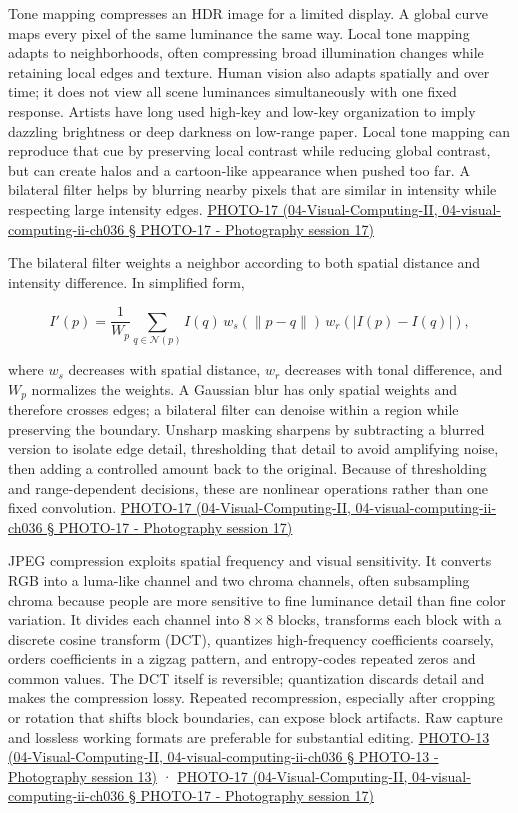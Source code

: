 Tone mapping compresses an HDR image for a limited display. A global curve maps every pixel of the same luminance the same way. Local tone mapping adapts to neighborhoods, often compressing broad illumination changes while retaining local edges and texture. Human vision also adapts spatially and over time; it does not view all scene luminances simultaneously with one fixed response. Artists have long used high-key and low-key organization to imply dazzling brightness or deep darkness on low-range paper. Local tone mapping can reproduce that cue by preserving local contrast while reducing global contrast, but can create halos and a cartoon-like appearance when pushed too far. A bilateral filter helps by blurring nearby pixels that are similar in intensity while respecting large intensity edges. \href{}{PHOTO-17 (04-Visual-Computing-II, 04-visual-computing-ii-ch036 § PHOTO-17 - Photography session 17)}

The bilateral filter weights a neighbor according to both spatial distance and intensity difference. In simplified form,

\[
I'(p)=\frac{1}{W_p}\sum_{q\in\mathcal N(p)} I(q)\,w_s(\|p-q\|)\,w_r(|I(p)-I(q)|),
\]

where \(w_s\) decreases with spatial distance, \(w_r\) decreases with tonal difference, and \(W_p\) normalizes the weights. A Gaussian blur has only spatial weights and therefore crosses edges; a bilateral filter can denoise within a region while preserving the boundary. Unsharp masking sharpens by subtracting a blurred version to isolate edge detail, thresholding that detail to avoid amplifying noise, then adding a controlled amount back to the original. Because of thresholding and range-dependent decisions, these are nonlinear operations rather than one fixed convolution. \href{}{PHOTO-17 (04-Visual-Computing-II, 04-visual-computing-ii-ch036 § PHOTO-17 - Photography session 17)}

JPEG compression exploits spatial frequency and visual sensitivity. It converts RGB into a luma-like channel and two chroma channels, often subsampling chroma because people are more sensitive to fine luminance detail than fine color variation. It divides each channel into \(8\times8\) blocks, transforms each block with a discrete cosine transform (DCT), quantizes high-frequency coefficients coarsely, orders coefficients in a zigzag pattern, and entropy-codes repeated zeros and common values. The DCT itself is reversible; quantization discards detail and makes the compression lossy. Repeated recompression, especially after cropping or rotation that shifts block boundaries, can expose block artifacts. Raw capture and lossless working formats are preferable for substantial editing. \href{}{PHOTO-13 (04-Visual-Computing-II, 04-visual-computing-ii-ch036 § PHOTO-13 - Photography session 13)} · \href{}{PHOTO-17 (04-Visual-Computing-II, 04-visual-computing-ii-ch036 § PHOTO-17 - Photography session 17)}

